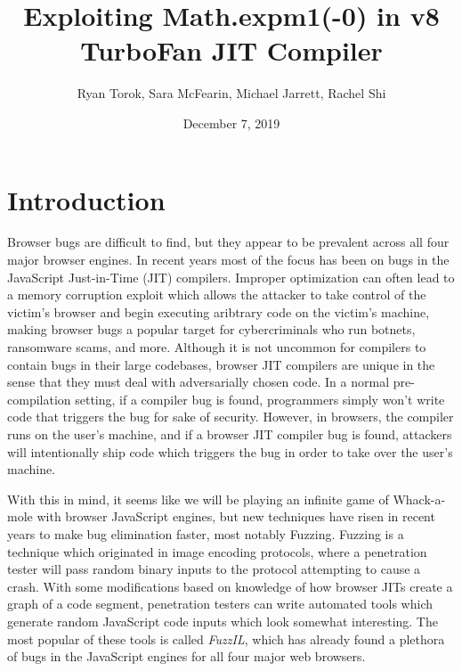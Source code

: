 \documentclass[11pt]{article}
\title{Exploiting Math.expm1(-0) in v8 TurboFan JIT Compiler}
\author{Ryan Torok, Sara McFearin, Michael Jarrett, Rachel Shi}
\date{December 7, 2019}
\begin{document}
\maketitle
\section{Introduction}
Browser bugs are difficult to find, but they appear to be prevalent across all four major browser
engines. In recent years most of the focus has been on bugs in the JavaScript Just-in-Time (JIT)
compilers. Improper optimization can often lead to a memory corruption exploit which allows the
attacker to take control of the victim's browser and begin executing aribtrary code on the victim's
machine, making browser bugs a popular target for cybercriminals who run botnets, ransomware scams,
and more. Although it is not uncommon for compilers to contain bugs in their large codebases,
browser JIT compilers are unique in the sense that they must deal with adversarially chosen code. In
a normal pre-compilation setting, if a compiler bug is found, programmers simply won't write code
that triggers the bug for sake of security. However, in browsers, the compiler runs on the user's
machine, and if a browser JIT compiler bug is found, attackers will intentionally ship code which
triggers the bug in order to take over the user's machine. 

With this in mind, it seems like we will be playing an infinite game of Whack-a-mole with browser
JavaScript engines, but new techniques have risen in recent years to make bug elimination faster,
most notably Fuzzing. Fuzzing is a technique which originated in image encoding protocols, where a
penetration tester will pass random binary inputs to the protocol attempting to cause a crash. With
some modifications based on knowledge of how browser JITs create a graph of a code segment,
penetration testers can write automated tools which generate random JavaScript code inputs which
look somewhat interesting. The most popular of these tools is called \textit{FuzzIL}, which has
already found a plethora of bugs in the JavaScript engines for all four major web browsers.
\end{document}
